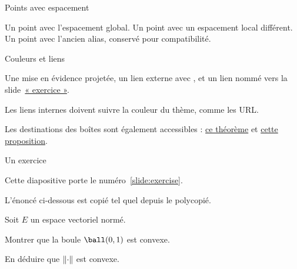 \begin{slide}{Points avec espacement}

\point Un point avec l'espacement global.
\point[top=1em] Un point avec un espacement local différent.
\newpoint Un point avec l'ancien alias, conservé pour compatibilité.

\end{slide}

\begin{slide}{Couleurs et liens}

Une \alert{mise en évidence projetée}, un lien externe avec
, et un lien nommé vers la
slide~\hyperref[slide:exercise]{« exercice »}.

\begin{theorem}[title={Lien interne}, label=thm:slide-link]%
    Les liens internes doivent suivre la couleur du thème, comme les URL.
\end{theorem}

Les destinations des boîtes sont également accessibles :
\hyperref[thm:slide-link]{ce théorème} et
\hyperref[prop:slide-proposition]{cette proposition}.

\end{slide}

\begin{slide}{Un exercice}
\label{slide:exercise}

Cette diapositive porte le numéro~\ref{slide:exercise}.

L'énoncé ci-dessous est copié tel quel depuis le polycopié.

\begin{exercise}[nosolution]
    Soit $E$ un espace vectoriel normé.
    \begin{question}
        Montrer que la boule $\ball(0,1)$ est convexe.
    \end{question}
    \begin{question}
        En déduire que $\lVert\cdot\rVert$ est convexe.
    \end{question}
\end{exercise}

\end{slide}
